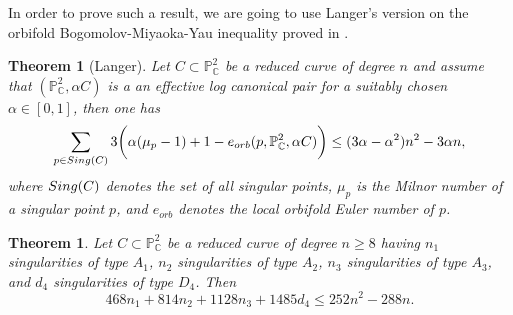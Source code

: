 \documentclass[11pt]{amsart}
\theoremstyle{plain}
\newtheorem{theorem}[thm]{Theorem}
\theoremstyle{definition}
\numberwithin{equation}{section}
\begin{document}
In order to prove such a result, we are going to use Langer's version on the orbifold Bogomolov-Miyaoka-Yau inequality proved in \cite[Section 11.1]{Langer}.
\begin{theorem}[Langer]
\label{langer}
Let $C \subset \mathbb{P}^{2}_{\mathbb{C}}$ be a reduced curve of degree $n$ and assume that $(\mathbb{P}^{2}_{\mathbb{C}},\alpha C)$ is a an effective log canonical pair for a suitably chosen $\alpha\in [0,1]$, then one has
$$\sum_{p \in {\rm Sing}(C)} 3\bigg(\alpha(\mu_{p}-1)+1-e_{orb}(p,\mathbb{P}^{2}_{\mathbb{C}},\alpha C)\bigg)\leq (3\alpha - \alpha^{2})n^{2}-3\alpha n,$$
where ${\rm Sing}(C)$ denotes the set of all singular points, $\mu_{p}$ is the Milnor number of a singular point $p$, and $e_{orb}$ denotes the local orbifold Euler number of $p$.
\end{theorem}
\begin{theorem}
\label{BMYoct}
Let $C \subset \mathbb{P}^{2}_{\mathbb{C}}$ be a reduced curve of degree $n \geq 8$ having $n_{1}$ singularities of type $A_{1}$, $n_{2}$ singularities of type $A_{2}$, $n_{3}$ singularities of type $A_{3}$, and $d_{4}$ singularities of type $D_{4}$. Then
$$468n_{1} + 814n_{2}+1128n_{3}+1485d_{4} \leq 252n^{2}-288n.$$
\end{theorem}
\end{document}
